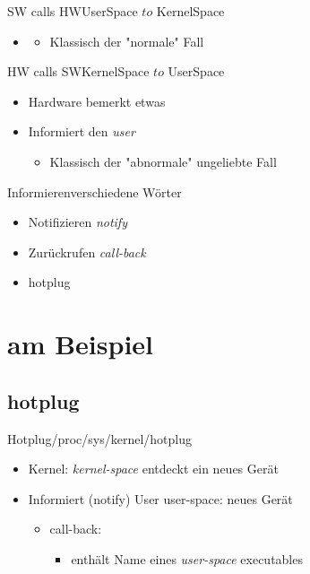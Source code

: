 \documentclass{beamer}
\begin{document}
\begin{frame}{SW calls HW}{UserSpace $to$ KernelSpace}
 \begin{itemize}
  \item {}
  \begin{itemize}
   \item Klassisch der "normale"{} Fall
  \end{itemize}
 \end{itemize}
\end{frame}

\begin{frame}{HW calls SW}{KernelSpace $to$ UserSpace}
 \begin{itemize}
  \item Hardware bemerkt etwas 
  \item Informiert den {\em user} 
  \begin{itemize}
   \item Klassisch der "abnormale"{} ungeliebte Fall
  \end{itemize}
 \end{itemize}
\end{frame}

\begin{frame}{Informieren}{verschiedene Wörter}
 \begin{itemize}
  \item Notifizieren {\em notify} 
  \item Zurückrufen {\em call-back}
  \item hotplug
 \end{itemize}
\end{frame}

\section{\linux am Beispiel \targetS}
\subsection{hotplug}

\begin{frame}{Hotplug}{/proc/sys/kernel/hotplug}
 \begin{itemize}
  \item Kernel: {\em kernel-space} entdeckt ein neues Gerät
  \item Informiert (notify) User user-space: neues Gerät
  \begin{itemize}
   \item call-back:  
   \begin{itemize}
    \item enthält Name eines {\em user-space} executables
   \end{itemize}
  \end{itemize}
 \end{itemize}
\end{frame}
\end{document}
